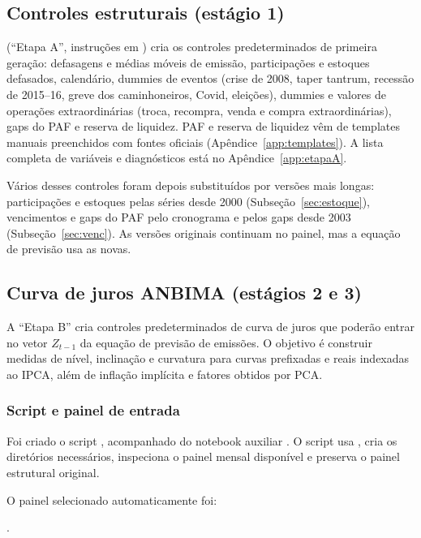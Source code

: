 \documentclass[12pt,a4paper]{article}
\begin{document}
\subsection{Controles estruturais (estágio 1)}

 (``Etapa A'', instruções em
) cria os controles predeterminados de primeira geração:
defasagens e médias móveis de emissão, participações e estoques defasados,
calendário, dummies de eventos (crise de 2008, taper tantrum, recessão de
2015--16, greve dos caminhoneiros, Covid, eleições), dummies e valores de operações
extraordinárias (troca, recompra, venda e compra extraordinárias), gaps do PAF e
reserva de liquidez. PAF e reserva de liquidez vêm de templates manuais preenchidos
com fontes oficiais (Apêndice~\ref{app:templates}). A lista completa de variáveis e
diagnósticos está no Apêndice~\ref{app:etapaA}.

Vários desses controles foram depois substituídos por versões mais longas:
participações e estoques pelas séries desde 2000 (Subseção~\ref{sec:estoque}),
vencimentos e gaps do PAF pelo cronograma e pelos gaps desde 2003
(Subseção~\ref{sec:venc}). As versões originais continuam no painel, mas a equação
de previsão usa as novas.

\subsection{Curva de juros ANBIMA (estágios 2 e 3)}

A ``Etapa B'' cria controles predeterminados de curva de juros
que poderão entrar no vetor \(Z_{t-1}\) da equação de previsão de emissões. O
objetivo é construir medidas de nível, inclinação e curvatura para curvas
prefixadas e reais indexadas ao IPCA, além de inflação implícita e fatores obtidos
por PCA.

\subsubsection{Script e painel de entrada}

Foi criado o script , acompanhado do
notebook auxiliar . O script usa
, cria os diretórios necessários, inspeciona o painel mensal
disponível e preserva o painel estrutural original.

O painel selecionado automaticamente foi:
\begin{center}
.
\end{center}
\end{document}
